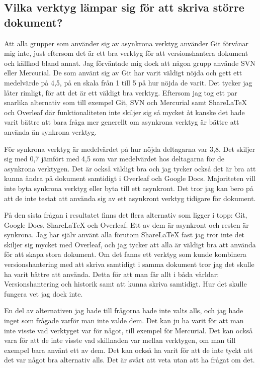 \subsection{Vilka verktyg lämpar sig för att skriva större dokument?}
Att alla grupper som använder sig av asynkrona verktyg använder Git förvånar mig inte, just eftersom det är ett bra verktyg för att versionshantera dokument och källkod bland annat. Jag förväntade mig dock att någon grupp använde SVN eller Mercurial. De som använt sig av Git har varit väldigt nöjda och gett ett medelvärde på 4,5, på en skala från 1 till 5 på hur nöjda de varit. Det tycker jag låter rimligt, för att det är ett väldigt bra verktyg. Eftersom jag tog ett par snarlika alternativ som till exempel Git, SVN och Mercurial samt ShareLaTeX och Overleaf där funktionaliteten inte skiljer sig så mycket åt kanske det hade varit bättre att bara fråga mer generellt om asynkrona verktyg är bättre att använda än synkrona verktyg.

För synkrona verktyg är medelvärdet på hur nöjda deltagarna var 3,8. Det skiljer sig med 0,7 jämfört med 4,5 som var medelvärdet hos deltagarna för de asynkrona verktygen. Det är också väldigt bra och jag tycker också det är bra att kunna ändra på dokument samtidigt i Overleaf och Google Docs. Majoriteten vill inte byta synkrona verktyg eller byta till ett asynkront. Det tror jag kan bero på att de inte testat att använda sig av ett asynkront verktyg tidigare för dokument.

På den sista frågan i resultatet finns det flera alternativ som ligger i topp: Git, Google Docs, ShareLaTeX och Overleaf. Ett av dem är asynkront och resten är synkrona. Jag har själv använt alla förutom ShareLaTeX fast jag tror inte det skiljer sig mycket med Overleaf, och jag tycker att alla är väldigt bra att använda för att skapa stora dokument. Om det fanns ett verktyg som kunde kombinera versionshantering med att skriva samtidigt i samma dokument tror jag det skulle ha varit bättre att använda. Detta för att man får allt i båda världar: Versionshantering och historik samt att kunna skriva samtidigt. Hur det skulle fungera vet jag dock inte.

En del av alternativen jag hade till frågorna hade inte valts alls, och jag hade inget som frågade varför man inte valde dem. Det kan ju ha varit för att man inte visste vad verktyget var för något, till exempel för Mercurial. Det kan också vara för att de inte visste vad skillnaden var mellan verktygen, om man till exempel bara använt ett av dem. Det kan också ha varit för att de inte tyckt att det var något bra alternativ alls. Det är svårt att veta utan att ha frågat om det. 


